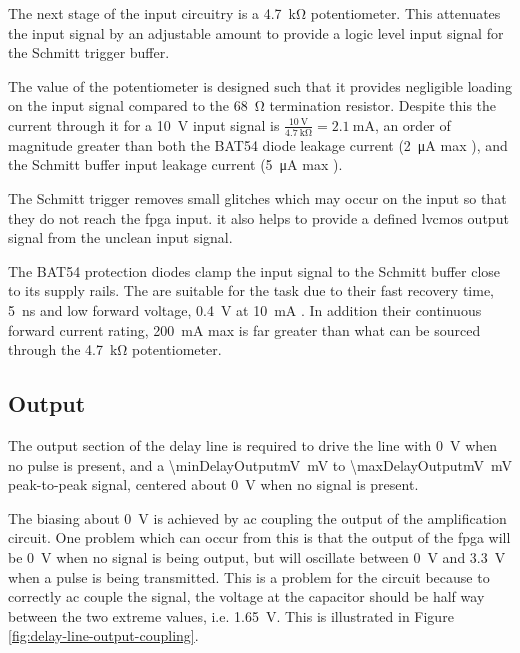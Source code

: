 The next stage of the input circuitry is a \SI{4.7}{\kilo\ohm} potentiometer. This attenuates the input signal by an adjustable amount to provide a logic level input signal for the Schmitt trigger buffer.

The value of the potentiometer is designed such that it provides negligible loading on the input signal compared to the \SI{68}{\ohm} termination resistor. Despite this the current through it for a \SI{10}{\volt} input signal is $\frac{\SI{10}{\volt}}{\SI{4.7}{\kilo\ohm}} = \SI{2.1}{\milli\ampere}$, an order of magnitude greater than both the BAT54 diode leakage current (\SI{2}{\micro\ampere} max \cite[p.2]{vishay2013}), and the Schmitt buffer input leakage current (\SI{5}{\micro\ampere} max \cite[p.4]{diodesinc2014}).

The Schmitt trigger removes small glitches which may occur on the input so that they do not reach the \gls{fpga} input. it also helps to provide a defined \gls{lvcmos} output signal from the unclean input signal.

The BAT54 protection diodes clamp the input signal to the Schmitt buffer close to its supply rails. The are suitable for the task due to their fast recovery time, \SI{5}{\nano\second} and low forward voltage, \SI{0.4}{\volt} at \SI{10}{\milli\ampere} \cite[p.2]{vishay2013}. In addition their continuous forward current rating, \SI{200}{\milli\ampere} max is far greater than what can be sourced through the \SI{4.7}{\kilo\ohm} potentiometer.

\subsection{Output}

The output section of the delay line is required to drive the line with \SI{0}{\volt} when no pulse is present, and a \SI{\minDelayOutputmV}{\milli\volt} to \SI{\maxDelayOutputmV}{\milli\volt} peak-to-peak signal, centered about \SI{0}{\volt} when no signal is present.


The biasing about \SI{0}{\volt} is achieved by \gls{ac} coupling the output of the amplification circuit. One problem which can occur from this is that the output of the \gls{fpga} will be \SI{0}{\volt} when no signal is being output, but will oscillate between \SI{0}{\volt} and \SI{3.3}{\volt} when a pulse is being transmitted. This is a problem for the circuit because to correctly \gls{ac} couple the signal, the voltage at the capacitor should be half way between the two extreme values, i.e. \SI{1.65}{\volt}. This is illustrated in Figure \ref{fig:delay-line-output-coupling}.

